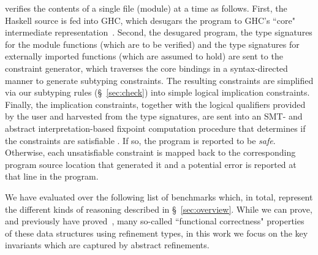 %
\toolname verifies the contents of a single file (module) at a time as follows. 
%
First, the Haskell source is fed into GHC, which desugars the program
to GHC's ``core" intermediate representation~\cite{VytiniotisJM12}.
%
Second, the desugared program,
the type signatures for the module functions (which are to be verified) and 
the type signatures for externally imported functions (which are assumed to hold)
are sent to the constraint generator, which traverses the core bindings in a
syntax-directed manner to generate subtyping constraints.
%
The resulting constraints are simplified via our subtyping rules
(\S~\ref{sec:check}) into simple logical implication
constraints.
%
Finally, the implication constraints, together with the logical
qualifiers provided by the user and harvested from the type
signatures, are sent into an SMT- and abstract interpretation-based
fixpoint computation procedure that determines if the constraints are
satisfiable \cite{GrafSaidi97,Houdini}.
%
If so, the program is reported to be \emph{safe}.
%
Otherwise, each unsatisfiable constraint is mapped back to the
corresponding program source location that generated it and a
potential error is reported at that line in the program.

We have evaluated \toolname over the following list of benchmarks
which, in total, represent the different kinds of reasoning described in
\S~\ref{sec:overview}.
%
While we can prove, and previously have proved~\cite{LiquidPLDI09},
many so-called ``functional correctness" properties of these data
structures using refinement types, in this work we focus on the key
invariants which are captured by abstract refinements.

